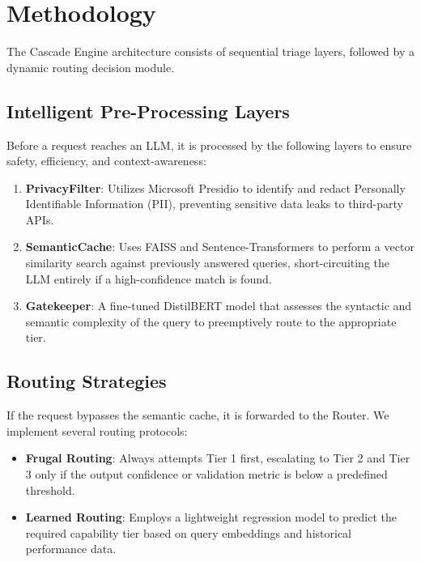 \section{Methodology}

The Cascade Engine architecture consists of sequential triage layers, followed by a dynamic routing decision module.

\subsection{Intelligent Pre-Processing Layers}
Before a request reaches an LLM, it is processed by the following layers to ensure safety, efficiency, and context-awareness:
\begin{enumerate}
    \item \textbf{PrivacyFilter}: Utilizes Microsoft Presidio to identify and redact Personally Identifiable Information (PII), preventing sensitive data leaks to third-party APIs.
    \item \textbf{SemanticCache}: Uses FAISS and Sentence-Transformers to perform a vector similarity search against previously answered queries, short-circuiting the LLM entirely if a high-confidence match is found.
    \item \textbf{Gatekeeper}: A fine-tuned DistilBERT model that assesses the syntactic and semantic complexity of the query to preemptively route to the appropriate tier.
\end{enumerate}

\subsection{Routing Strategies}
If the request bypasses the semantic cache, it is forwarded to the Router. We implement several routing protocols:
\begin{itemize}
    \item \textbf{Frugal Routing}: Always attempts Tier 1 first, escalating to Tier 2 and Tier 3 only if the output confidence or validation metric is below a predefined threshold.
    \item \textbf{Learned Routing}: Employs a lightweight regression model to predict the required capability tier based on query embeddings and historical performance data.
\end{itemize}
